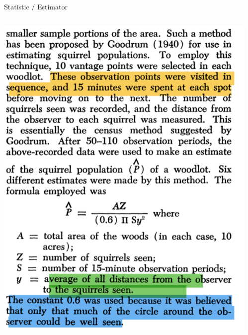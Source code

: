 \documentclass[aspectratio=169]{../latex_main/tntbeamer}  %
\begin{document}
 
 \begin{frame}{Statistic / Estimator}
	    \begin{columns}
	        \begin{column}{.4\textwidth}

\includegraphics[scale=.38]{figure/squirrel_stat}
	       
	        \end{column}
	            
	        \begin{column}{.4\textwidth}
	            

\end{column}
\end{columns}
\end{frame}
\end{document}
